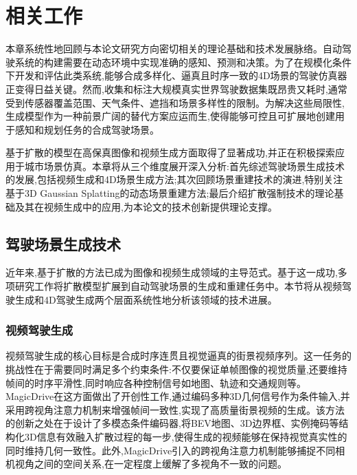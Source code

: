 
\chapter{相关工作}

本章系统性地回顾与本论文研究方向密切相关的理论基础和技术发展脉络。自动驾驶系统的构建需要在动态环境中实现准确的感知、预测和决策\cite{chen2024autonomous,hu2023planning,ma2024vision,kong2025multimodal}。为了在规模化条件下开发和评估此类系统,能够合成多样化、逼真且时序一致的4D场景的驾驶仿真器正变得日益关键。然而,收集和标注大规模真实世界驾驶数据集既昂贵又耗时,通常受到传感器覆盖范围、天气条件、遮挡和场景多样性的限制。为解决这些局限性,生成模型作为一种前景广阔的替代方案应运而生,使得能够可控且可扩展地创建用于感知和规划任务的合成驾驶场景。

基于扩散的模型在高保真图像和视频生成方面取得了显著成功,并正在积极探索应用于城市场景仿真。本章将从三个维度展开深入分析:首先综述驾驶场景生成技术的发展,包括视频生成和4D场景生成方法;其次回顾场景重建技术的演进,特别关注基于3D Gaussian Splatting的动态场景重建方法;最后介绍扩散强制技术的理论基础及其在视频生成中的应用,为本论文的技术创新提供理论支撑。

\section{驾驶场景生成技术}

近年来,基于扩散的方法\cite{ho2020denoising,ddpm2015,song2020score}已成为图像和视频生成领域的主导范式。基于这一成功,多项研究工作\cite{gao2024magicdrive,wen2024panacea,mao2025dreamdrive,wang2024drivedreamer,wang2024stag1,wen2024panacea,li2024hierarchical,gao2025vista,li2023bridging,wang2024driving}将扩散模型扩展到自动驾驶场景的生成和重建任务中。本节将从视频驾驶生成和4D驾驶生成两个层面系统性地分析该领域的技术进展。

\subsection{视频驾驶生成}

视频驾驶生成的核心目标是合成时序连贯且视觉逼真的街景视频序列。这一任务的挑战性在于需要同时满足多个约束条件:不仅要保证单帧图像的视觉质量,还要维持帧间的时序平滑性,同时响应各种控制信号如地图、轨迹和交通规则等。MagicDrive\cite{gao2024magicdrive}在这方面做出了开创性工作,通过编码多种3D几何信号作为条件输入,并采用跨视角注意力机制来增强帧间一致性,实现了高质量街景视频的生成。该方法的创新之处在于设计了多模态条件编码器,将BEV地图、3D边界框、实例掩码等结构化3D信息有效融入扩散过程的每一步,使得生成的视频能够在保持视觉真实性的同时维持几何一致性。此外,MagicDrive引入的跨视角注意力机制能够捕捉不同相机视角之间的空间关系,在一定程度上缓解了多视角不一致的问题。


